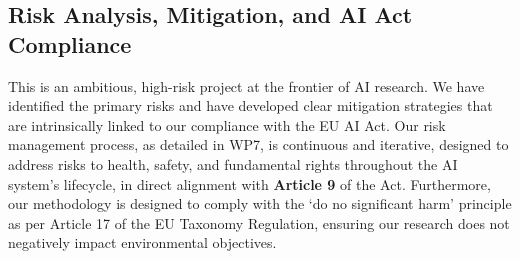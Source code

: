 \documentclass[11pt, a4paper]{article}
\begin{document}
\subsection{Risk Analysis, Mitigation, and AI Act Compliance}
This is an ambitious, high-risk project at the frontier of AI research. We have identified the primary risks and have developed clear mitigation strategies that are intrinsically linked to our compliance with the EU AI Act. Our risk management process, as detailed in WP7, is continuous and iterative, designed to address risks to health, safety, and fundamental rights throughout the AI system's lifecycle, in direct alignment with \textbf{Article 9} of the Act. Furthermore, our methodology is designed to comply with the ‘do no significant harm’ principle as per Article 17 of the EU Taxonomy Regulation, ensuring our research does not negatively impact environmental objectives.
\end{document}
